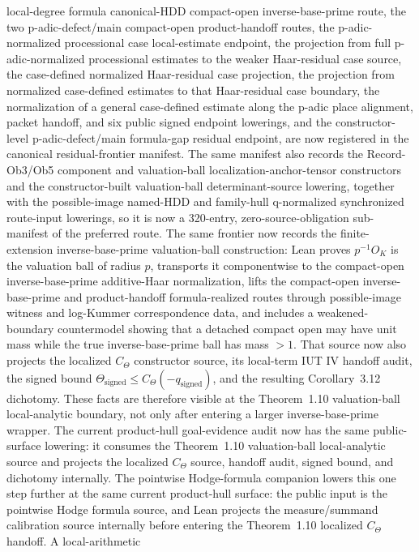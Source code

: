 \documentclass[11pt]{article}
\newcommand{\IUT}{IUT}
\theoremstyle{plain}
\theoremstyle{definition}
\theoremstyle{remark}
\begin{document}
local-degree formula canonical-HDD compact-open inverse-base-prime route, the
two p-adic-defect/main compact-open product-handoff routes, the
p-adic-normalized processional case local-estimate endpoint, the projection
from full p-adic-normalized processional estimates to the weaker
Haar-residual case source, the case-defined normalized Haar-residual case
projection, the projection from normalized case-defined estimates to that
Haar-residual case boundary, the normalization of a general case-defined
estimate along the p-adic place alignment, packet handoff, and six public
signed endpoint lowerings, and the
constructor-level p-adic-defect/main formula-gap residual endpoint, are now
registered in the canonical residual-frontier manifest.  The same manifest also
records the Record-Ob3/Ob5 component and valuation-ball
localization-anchor-tensor constructors and the constructor-built
valuation-ball determinant-source lowering, together with the possible-image
named-HDD and family-hull q-normalized synchronized route-input lowerings, so
it is now a 320-entry,
zero-source-obligation sub-manifest of the preferred
route.  The same frontier now records the finite-extension
inverse-base-prime valuation-ball construction: Lean proves \(p^{-1}O_K\) is
the valuation ball of radius \(p\), transports it componentwise to the
compact-open inverse-base-prime additive-Haar normalization, lifts the
compact-open inverse-base-prime and product-handoff formula-realized routes
through possible-image witness and log-Kummer correspondence data, and includes a
weakened-boundary countermodel showing that a detached compact open may have
unit mass while the true inverse-base-prime ball has mass \(>1\).
That source now
also projects the
localized \(C_\Theta\) constructor source, its local-term \IUT{} IV handoff
audit, the signed bound
\(\Theta_{\mathrm{signed}}\leq C_\Theta(-q_{\mathrm{signed}})\), and the
resulting Corollary~3.12 dichotomy.  These facts are therefore visible at the
Theorem~1.10 valuation-ball local-analytic boundary, not only after entering a
larger inverse-base-prime wrapper.  The current product-hull goal-evidence audit
now has the same public-surface lowering: it consumes the Theorem~1.10
valuation-ball local-analytic source and projects the localized \(C_\Theta\)
source, handoff audit, signed bound, and dichotomy internally.  The pointwise
Hodge-formula companion lowers this one step further at the same current
product-hull surface: the public input is the pointwise Hodge formula source,
and Lean projects the measure/summand calibration source internally before
entering the Theorem~1.10 localized \(C_\Theta\) handoff.  A local-arithmetic
\end{document}

